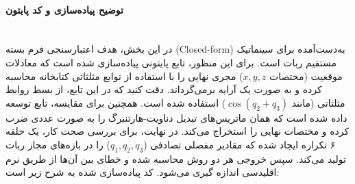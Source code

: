 \documentclass{article}
\begin{document}
\paragraph{توضیح پیاده‌سازی و کد پایتون}\mbox{}\\
در این بخش، هدف اعتبارسنجی فرم بسته (Closed-form) به‌دست‌آمده برای سینماتیک مستقیم ربات است. برای این منظور، تابع پایتونی  پیاده‌سازی شده است که معادلات موقعیت (مختصات $x, y, z$) مجری نهایی را با استفاده از توابع مثلثاتی کتابخانه  محاسبه کرده و به صورت یک آرایه برمی‌گرداند. دقت کنید که در این تابع، از بسط روابط مثلثاتی (مانند $\cos(q_2+q_3)$) استفاده شده است.
همچنین برای مقایسه، تابع  توسعه داده شده است که همان ماتریس‌های تبدیل دناویت-هارتنبرگ را به صورت عددی ضرب کرده و مختصات نهایی را استخراج می‌کند. 
در نهایت، برای بررسی صحت کار، یک حلقه ۶ تکراره ایجاد شده که مقادیر مفصلی تصادفی ($q_1, q_2, q_3$) را در بازه‌های مجاز ربات تولید می‌کند. سپس خروجی هر دو روش محاسبه شده و خطای بین آن‌ها از طریق نرم اقلیدسی اندازه گیری می‌شود. کد پیاده‌سازی شده به شرح زیر است:
\end{document}
